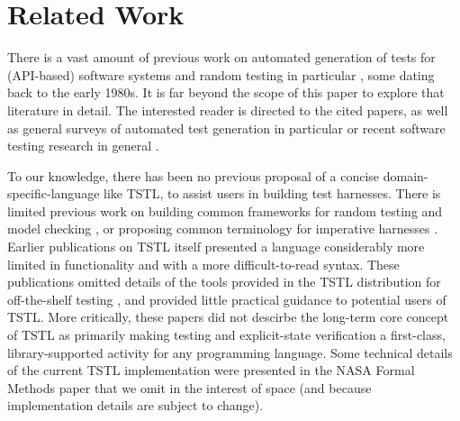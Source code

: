 \section{Related Work}
\label{sec:related}

There is a vast amount of previous work on automated generation of
tests for (API-based) software systems
\cite{Pacheco,FA11,GodefroidKS05} and random testing in particular
\cite{ICSEDiff,Pacheco,AMFL11,ARTChen,ISSTAART,FASE,HamletOnly,Hamlet94,ClaessenH00,CiupaLOM07,RandFormal,woda08,andrews-etal-rute-rt,ASE08,evalrand},
some dating back to the early 1980s. It is far beyond the scope of
this paper to explore that literature in detail.  The interested
reader is directed to the cited papers, as well as general surveys of
automated test generation in particular \cite{anand2013orchestrated}
or recent software testing research in general \cite{orsofuse}.  



To our knowledge, there has been no previous proposal of a concise
domain-specific-language \cite{Fow10} like TSTL, to assist users in building test
harnesses.  There is limited previous work on
building common frameworks for random testing and model checking
\cite{woda08}, or proposing common terminology for imperative
harnesses \cite{woda12}.  Earlier publications on TSTL itself \cite{NFM15,ISSTA15} presented a
language considerably more limited in functionality and with a more
difficult-to-read syntax.  These publications omitted details of the tools provided in the TSTL distribution for
off-the-shelf testing \cite{tstl}, and provided little practical
guidance to potential users of TSTL.  More critically, these papers
did not descirbe the long-term core concept of TSTL as primarily
making testing and explicit-state verification
a first-class, library-supported activity for any programming
language.  Some technical
details of the current TSTL implementation were presented in the NASA
Formal Methods paper \cite{NFM15} that we omit in
the interest of space (and because implementation details are subject
to change).

